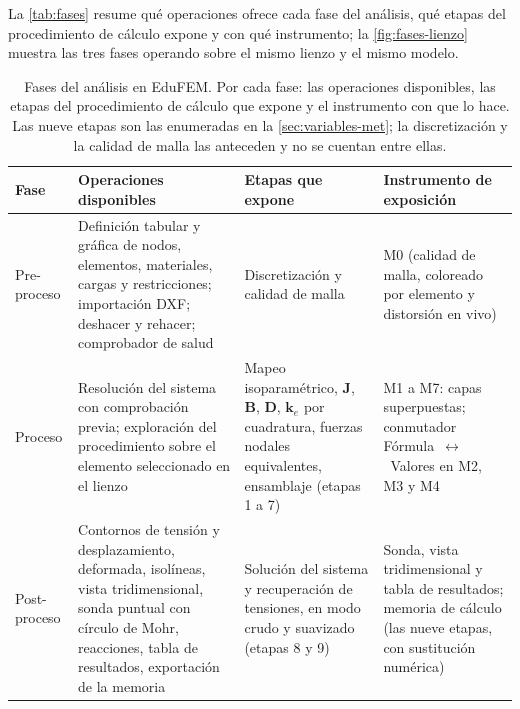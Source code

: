 La \autoref{tab:fases} resume qué operaciones ofrece cada fase del análisis, qué etapas del procedimiento de cálculo expone y con qué instrumento; la \autoref{fig:fases-lienzo} muestra las tres fases operando sobre el mismo lienzo y el mismo modelo.

\begin{table}[!htbp]
\centering
\caption[Fases del análisis en EduFEM: operaciones y exposición del procedimiento.]{Fases del análisis en EduFEM. Por cada fase: las operaciones disponibles, las etapas del procedimiento de cálculo que expone y el instrumento con que lo hace. Las nueve etapas son las enumeradas en la \autoref{sec:variables-met}; la discretización y la calidad de malla las anteceden y no se cuentan entre ellas.}
\label{tab:fases}
{\footnotesize
\setlength{\tabcolsep}{4pt}
\begin{tabular}{@{}>{\raggedright\arraybackslash}p{1.9cm}>{\raggedright\arraybackslash}p{5.1cm}>{\raggedright\arraybackslash}p{3.3cm}>{\raggedright\arraybackslash}p{3.7cm}@{}}
\toprule
\textbf{Fase} & \textbf{Operaciones disponibles} & \textbf{Etapas que expone} & \textbf{Instrumento de exposición} \\
\midrule
Pre-proceso & Definición tabular y gráfica de nodos, elementos, materiales, cargas y restricciones; importación DXF; deshacer y rehacer; comprobador de salud & Discretización y calidad de malla & M0 (calidad de malla, coloreado por elemento y distorsión en vivo) \\
Proceso & Resolución del sistema con comprobación previa; exploración del procedimiento sobre el elemento seleccionado en el lienzo & Mapeo isoparamétrico, $\bm{J}$, $\bm{B}$, $\bm{D}$, $\bm{k}_e$ por cuadratura, fuerzas nodales equivalentes, ensamblaje (etapas 1 a 7) & M1 a M7: capas superpuestas; conmutador Fórmula~$\leftrightarrow$~Valores en M2, M3 y M4 \\
Post-proceso & Contornos de tensión y desplazamiento, deformada, isolíneas, vista tridimensional, sonda puntual con círculo de Mohr, reacciones, tabla de resultados, exportación de la memoria & Solución del sistema y recuperación de tensiones, en modo crudo y suavizado (etapas 8 y 9) & Sonda, vista tridimensional y tabla de resultados; memoria de cálculo (las nueve etapas, con sustitución numérica) \\
\bottomrule
\end{tabular}}
\end{table}

